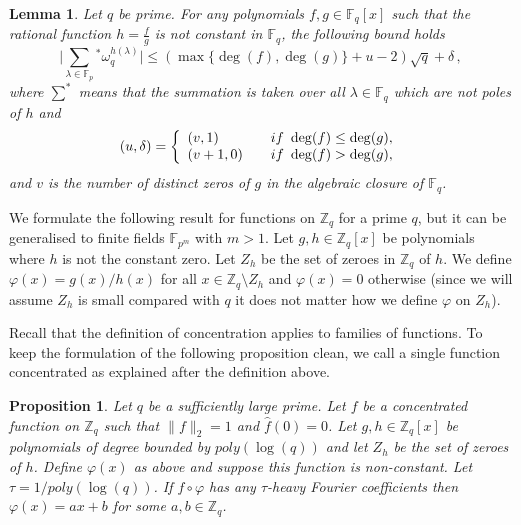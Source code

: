 \documentclass[11pt]{article}
\newtheorem{lemma}[theorem]{Lemma}
\newtheorem{proposition}[theorem]{Proposition}
\theoremstyle{definition}
\newcommand{\F}{{\mathbb{F}}}
\newcommand{\Z}{\mathbb{Z}}
\begin{document}
\begin{lemma}\label{lem_character_sum}
    Let $q$ be prime. For any polynomials $f,g \in \F_q[x]$ such that the rational function $h = \frac{f}{g}$ is not constant in $\F_q$, the following bound holds
    \[ \Bigg| \sum_{\lambda \in \F_p}{}^{*} \omega_q^{h(\lambda)} \Bigg| \leq (\max\{\deg(f), \deg(g)\} + u -2) \sqrt{q} + \delta \,, \]
    where $\sum^*$ means that the summation is taken over all $\lambda \in \F_q$ which are not poles of $h$ and
    \begin{displaymath}
        (u,\delta) = \left\{
        \begin{array}{l l}
            (v,1)   & \quad if \ \deg(f) \leq \deg(g),\\      (v+1,0) & \quad if \ \deg(f)>\deg(g),
        \end{array}
        \right .
    \end{displaymath}
    and $v$ is the number of distinct zeros of $g$ in the algebraic closure of $\F_q$.
\end{lemma}

We formulate the following result for functions on $\Z_q$ for a prime $q$, but it can be generalised to finite fields $\F_{p^m}$ with $m > 1$.
Let $g, h \in \Z_{q}[x]$ be polynomials where $h$ is not the constant zero.
Let $Z_h$ be the set of zeroes in $\Z_{q}$ of $h$. We define
$\varphi(x) = g(x)/h(x)$ for all $x \in \Z_q \setminus Z_h$ and $\varphi(x) = 0$ otherwise (since we will assume $Z_h$ is small compared with $q$ it does not matter how we define $\varphi$ on $Z_h$).


Recall that the definition of concentration applies to families of functions. To keep the formulation of the following proposition clean, we call a single function concentrated as explained after the definition above.

\begin{proposition}\label{prop_limit}
    Let $q$ be a sufficiently large prime.
    Let $f$ be a concentrated function on $\Z_q$ such that $\|f\|_2=1$ and $\widehat{f}(0) = 0$.
    Let $g, h \in \Z_q[x]$ be polynomials of degree bounded by $poly(\log(q))$ and let $Z_h$ be the set of zeroes of $h$.
    Define $\varphi(x)$ as above and suppose this function is non-constant.
    Let $\tau = 1/poly(\log(q))$. If $f \circ \varphi$ has any $\tau$-heavy Fourier coefficients then $\varphi(x) = ax + b$ for some $a, b \in \Z_q$.
\end{proposition}
\end{document}
